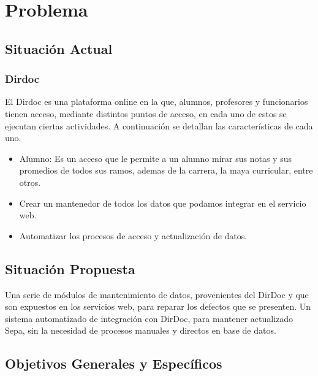 \documentclass[a4paper,12pt,openany,oneside]{book}
\begin{document}
\chapter{Problema}
\thispagestyle{empty}
\section{Situación Actual}
\subsection{Dirdoc}
El Dirdoc es una plataforma online en la que, alumnos, profesores y funcionarios tienen acceso, mediante distintos puntos de acceso, en cada uno de estos se ejecutan ciertas actividades. A continuación se detallan las características de cada uno.

\begin{itemize}
	\item Alumno: Es un acceso que le permite a un alumno mirar sus notas y sus promedios de todos sus ramos, ademas de la carrera, la maya curricular, entre otros.
	\item Crear un mantenedor de todos los datos que podamos integrar en el servicio web.
	\item Automatizar los procesos de acceso y actualización de datos.
\end{itemize}

\section{Situación Propuesta}
Una serie de módulos de mantenimiento de datos, provenientes del DirDoc y que son expuestos en los servicios web, para reparar los defectos que se presenten. Un sistema automatizado de integración con DirDoc,  para mantener actualizado Sepa, sin la necesidad de procesos manuales y directos en base de datos.
\section{Objetivos Generales y Específicos}
\end{document}
